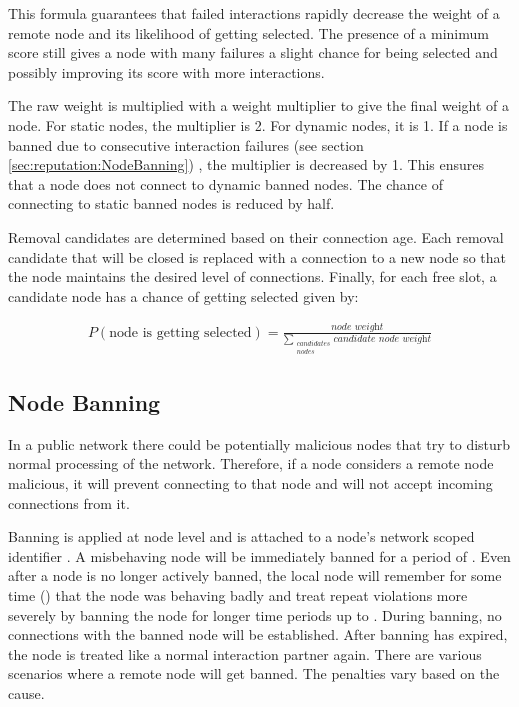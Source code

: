 This formula guarantees that failed interactions rapidly decrease the weight of a remote node and its likelihood of getting selected.
The presence of a minimum score still gives a node with many failures a slight chance for being selected and possibly improving its score with more interactions.

The raw weight is multiplied with a weight multiplier to give the final weight of a node.
For static nodes, the multiplier is 2.
For dynamic nodes, it is 1.
If a node is banned due to consecutive interaction failures (see section \autoref{sec:reputation:NodeBanning}) , the multiplier is decreased by 1.
This ensures that a node does not connect to dynamic banned nodes.
The chance of connecting to static banned nodes is reduced by half.

Removal candidates are determined based on their connection age.
Each removal candidate that will be closed is replaced with a connection to a new node so that the node maintains the desired level of connections.
Finally, for each free slot, a candidate node has a chance of getting selected given by:

\begin{align*}
P(\textrm{node is getting selected}) = \frac{\textit{node weight}}{\sum\limits_{\substack{candidates\\nodes}} \textit{candidate node weight}}
\end{align*}

\subsection{Node Banning}
\label{sec:reputation:NodeBanning}

In a public network there could be potentially malicious nodes that try to disturb normal processing of the network.
Therefore, if a node considers a remote node malicious, it will prevent connecting to that node and will not accept incoming connections from it.

Banning is applied at node level and is attached to a node's network scoped identifier .
A misbehaving node will be immediately banned for a period of .
Even after a node is no longer actively banned, the local node will remember for some time () that the node was behaving badly and treat repeat violations more severely by banning the node for longer time periods up to .
During banning, no connections with the banned node will be established.
After banning has expired, the node is treated like a normal interaction partner again.
There are various scenarios where a remote node will get banned.
The penalties vary based on the cause.

